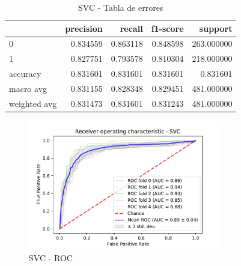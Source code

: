 \documentclass[12pt,twoside]{report}
\begin{document}
\begin{table}[htp]
\begin{center}
\begin{tabular}{lrrrr}
\toprule
{} &  precision &    recall &  f1-score &     support \\
\midrule
0            &   0.834559 &  0.863118 &  0.848598 &  263.000000 \\
1            &   0.827751 &  0.793578 &  0.810304 &  218.000000 \\
accuracy     &   0.831601 &  0.831601 &  0.831601 &    0.831601 \\
macro avg    &   0.831155 &  0.828348 &  0.829451 &  481.000000 \\
weighted avg &   0.831473 &  0.831601 &  0.831243 &  481.000000 \\
\bottomrule
\end{tabular}
\end{center}
\caption{SVC - Tabla de errores}
\label{svc:precision}
\end{table}

\begin{figure}[htp]
\begin{center}
\includegraphics[width=8.5cm]{./code/figures_python/roc/svc.pdf}%
\end{center}
 \caption{SVC - ROC}
 \label{svc:roc}
 \end{figure}
 
\end{document}

